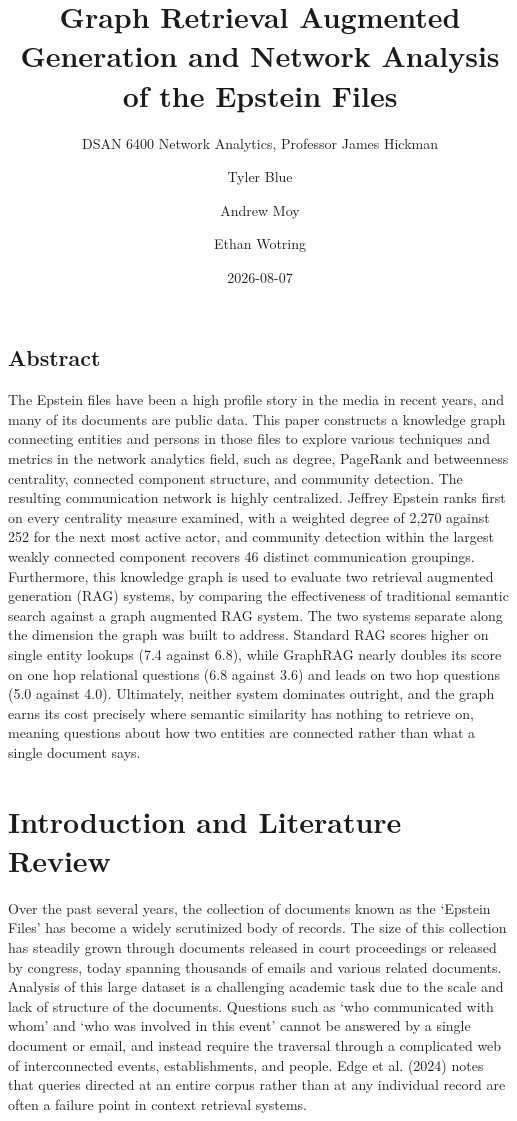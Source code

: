 \documentclass[
  letterpaper,
  DIV=11,
  numbers=noendperiod]{scrartcl}
\title{Graph Retrieval Augmented Generation and Network Analysis of the
Epstein Files}
\subtitle{DSAN 6400 Network Analytics, Professor James Hickman}
\author{Tyler Blue \and Andrew Moy \and Ethan Wotring}
\date{2026-08-07}
\renewcommand*\contentsname{Table of contents}
\newcommand\contentsname{Table of contents}
\begin{document}
\maketitle

\renewcommand*\contentsname{Table of contents}
{
\hypersetup{linkcolor=}
\setcounter{tocdepth}{3}
\tableofcontents
}

\subsection*{Abstract}\label{abstract}

The Epstein files have been a high profile story in the media in recent
years, and many of its documents are public data. This paper constructs
a knowledge graph connecting entities and persons in those files to
explore various techniques and metrics in the network analytics field,
such as degree, PageRank and betweenness centrality, connected component
structure, and community detection. The resulting communication network
is highly centralized. Jeffrey Epstein ranks first on every centrality
measure examined, with a weighted degree of 2,270 against 252 for the
next most active actor, and community detection within the largest
weakly connected component recovers 46 distinct communication groupings.
Furthermore, this knowledge graph is used to evaluate two retrieval
augmented generation (RAG) systems, by comparing the effectiveness of
traditional semantic search against a graph augmented RAG system. The
two systems separate along the dimension the graph was built to address.
Standard RAG scores higher on single entity lookups (7.4 against 6.8),
while GraphRAG nearly doubles its score on one hop relational questions
(6.8 against 3.6) and leads on two hop questions (5.0 against 4.0).
Ultimately, neither system dominates outright, and the graph earns its
cost precisely where semantic similarity has nothing to retrieve on,
meaning questions about how two entities are connected rather than what
a single document says.

\section{Introduction and Literature
Review}\label{introduction-and-literature-review}

Over the past several years, the collection of documents known as the
`Epstein Files' has become a widely scrutinized body of records. The
size of this collection has steadily grown through documents released in
court proceedings or released by congress, today spanning thousands of
emails and various related documents. Analysis of this large dataset is
a challenging academic task due to the scale and lack of structure of
the documents. Questions such as `who communicated with whom' and `who
was involved in this event' cannot be answered by a single document or
email, and instead require the traversal through a complicated web of
interconnected events, establishments, and people. Edge et al. (2024)
notes that queries directed at an entire corpus rather than at any
individual record are often a failure point in context retrieval
systems.
\end{document}

